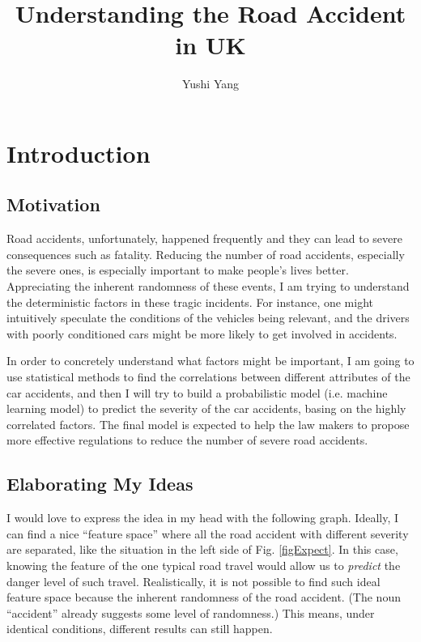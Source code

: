\documentclass[12pt,a4paper]{article}
\begin{document}
\title{Understanding the Road Accident in UK}
\author{Yushi Yang}
\maketitle

\section{Introduction}

\subsection{Motivation}

Road accidents, unfortunately, happened frequently and they can lead to severe consequences such as fatality. Reducing the number of road accidents, especially the severe ones, is especially important to make people's lives better. Appreciating the inherent randomness of these events, I am trying to understand the deterministic factors in these tragic incidents. For instance, one might intuitively speculate the conditions of the vehicles being relevant, and the drivers with poorly conditioned cars might be more likely to get involved in accidents.

In order to concretely understand what factors might be important, I am going to use statistical methods to find the correlations between different attributes of the car accidents, and then I will try to build a probabilistic model (i.e. machine learning model) to predict the severity of the car accidents, basing on the highly correlated factors. The final model is expected to help the law makers to propose more effective regulations to reduce the number of severe road accidents.

\subsection{Elaborating My Ideas}

I would love to express the idea in my head with the following graph. Ideally, I can find a nice ``feature space'' where all the road accident with different severity are separated, like the situation in the left side of Fig. \ref{figExpect}. In this case, knowing the feature of the one typical road travel would allow us to \emph{predict} the danger level of such travel. Realistically, it is not possible to find such ideal feature space because the inherent randomness of the road accident. (The noun ``accident'' already suggests some level of randomness.) This means, under identical conditions, different results can still happen.
\end{document}
